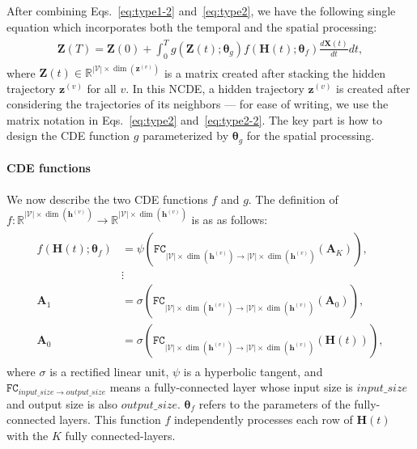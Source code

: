 \documentclass[letterpaper]{article} \usepackage{aaai22}  \usepackage{times}  \usepackage{helvet}  \usepackage{courier}  \usepackage[hyphens]{url}  \usepackage{graphicx} \urlstyle{rm} \def\UrlFont{\rm}  \usepackage{natbib}  \usepackage{caption} \DeclareCaptionStyle{ruled}{labelfont=normalfont,labelsep=colon,strut=off} \frenchspacing  \setlength{\pdfpagewidth}{8.5in}  \setlength{\pdfpageheight}{11in}  \usepackage{stfloats}
\begin{document}
After combining Eqs.~\eqref{eq:type1-2} and~\eqref{eq:type2}, we have the following single equation which incorporates both the temporal and the spatial processing:
\begin{align}\begin{split}
\bm{Z}(T) = \bm{Z}(0) + \int_{0}^{T} g(\bm{Z}(t);\bm{\theta}_g)f(\bm{H}(t);\bm{\theta}_f) \frac{d\bm{X}(t)}{dt} dt , \label{eq:type2-2}
\end{split}\end{align}where $\bm{Z}(t) \in \mathbb{R}^{|\mathcal{V}| \times \dim(\bm{z}^{(v)})}$ is a matrix created after stacking the hidden trajectory $\bm{z}^{(v)}$ for all $v$. In this NCDE, a hidden trajectory $\bm{z}^{(v)}$ is created after considering the trajectories of its neighbors --- for ease of writing, we use the matrix notation in Eqs.~\eqref{eq:type2} and~\eqref{eq:type2-2}. The key part is how to design the CDE function $g$ parameterized by $\bm{\theta}_g$ for the spatial processing.

\paragraph{CDE functions} We now describe the two CDE functions $f$ and $g$. The definition of $f:\mathbb{R}^{|\mathcal{V}| \times \dim(\bm{h}^{(v)})} \rightarrow \mathbb{R}^{|\mathcal{V}| \times \dim(\bm{h}^{(v)})}$ is as as follows:
\begin{align}\begin{split}
f(\bm{H}(t);\bm{\theta}_f) &= \psi(\texttt{FC}_{|\mathcal{V}| \times \dim(\bm{h}^{(v)}) \rightarrow |\mathcal{V}| \times \dim(\bm{h}^{(v)})}(\bm{A}_{K})),\\
&\vdots\\
\bm{A}_1 &= \sigma(\texttt{FC}_{|\mathcal{V}| \times \dim(\bm{h}^{(v)}) \rightarrow |\mathcal{V}| \times \dim(\bm{h}^{(v)})}(\bm{A}_0)),\\
\bm{A}_0 &= \sigma(\texttt{FC}_{|\mathcal{V}| \times \dim(\bm{h}^{(v)}) \rightarrow |\mathcal{V}| \times \dim(\bm{h}^{(v)})}(\bm{H}(t))),\label{eq:fun_f}
\end{split}\end{align}
where $\sigma$ is a rectified linear unit, $\psi$ is a hyperbolic tangent, and $\mathtt{FC}_{input\_size \rightarrow output\_size}$ means a fully-connected layer whose input size is $input\_size$ and output size is also $output\_size$. $\bm{\theta}_f$ refers to the parameters of the fully-connected layers. This function $f$ independently processes each row of $\bm{H}(t)$ with the $K$ fully connected-layers.
\end{document}
